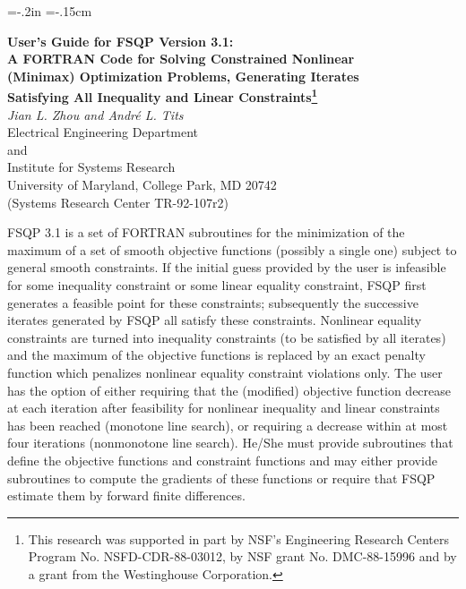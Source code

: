 

\pagestyle{myheadings}
\renewcommand{\baselinestretch}{1.08} %
 \textheight=8.3in
\topmargin=-.2in
\textwidth=6.5in
\oddsidemargin=-.15cm

\thispagestyle{empty}
\begin{titlepage}
\begin{center}
{\large \bf User's Guide for FSQP Version 3.1:\\
\vspace{1mm}
    A FORTRAN Code for Solving Constrained Nonlinear \\
\vspace{1mm} 
    (Minimax) Optimization Problems, Generating Iterates \\
\vspace{1mm}
    Satisfying All Inequality and Linear Constraints\footnote{
This research was supported in part by NSF's Engineering Research Centers 
Program No. NSFD-CDR-88-03012, by NSF grant No. DMC-88-15996 and by a grant
from the Westinghouse Corporation.}}\\
\vspace{4mm}
          {\it Jian L. Zhou and Andr\'{e} L. Tits} \\
\vspace{4mm}
    Electrical Engineering Department\\
            and\\
    Institute for Systems Research\\
    University of Maryland, College Park, MD 20742\\
     (Systems Research Center TR-92-107r2)
\end{center}
\vspace{3mm}    
\vspace{1em}    

\hspace{4mm}FSQP 3.1 is a set of FORTRAN subroutines
for the minimization of the maximum of a set of smooth 
objective functions (possibly a single one) subject to 
general smooth constraints.
If the initial guess provided by the user is infeasible for
some inequality constraint or some linear equality constraint, FSQP first 
generates a feasible point for these constraints; 
subsequently the successive iterates generated by
FSQP all satisfy these constraints. Nonlinear equality constraints
are turned into inequality constraints (to be satisfied by all iterates)
and the maximum of the objective functions is replaced 
by an exact penalty function which
penalizes nonlinear equality constraint violations only. 
The user has the option of either
requiring that the (modified) objective function decrease 
at each iteration after feasibility for nonlinear inequality and
linear constraints has been reached (monotone line search), or
requiring a decrease within at most four iterations (nonmonotone line search).
He/She must provide subroutines that define the objective functions
and constraint functions and may either provide subroutines
to compute the gradients of these functions or require that FSQP
estimate them by forward finite differences.


\end{titlepage}
